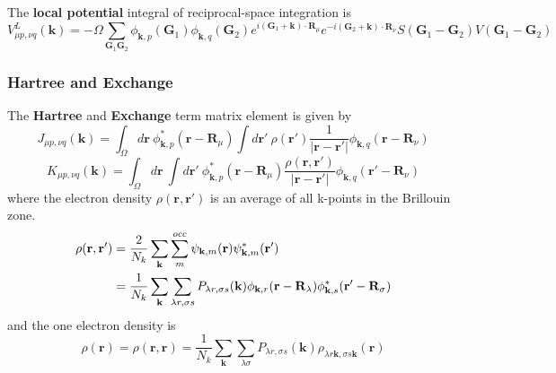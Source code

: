 \documentclass{article}
\begin{document}
            The \textbf{local potential} integral of reciprocal-space integration is
            \begin{equation}
                V_{\mu p,\nu q}^L(\textbf{k}) = -\Omega\sum_{\textbf{G}_1\textbf{G}_2}\phi_{\textbf{k},p}(\textbf{G}_1)\phi_{\textbf{k},q}(\textbf{G}_2)e^{i(\textbf{G}_1+\textbf{k})\cdot\textbf{R}_{\mu}}e^{-i(\textbf{G}_2+\textbf{k})\cdot\textbf{R}_{\nu}}S(\textbf{G}_1-\textbf{G}_2)V(\textbf{G}_1-\textbf{G}_2)
            \end{equation}         
            
        \subsubsection{Hartree and Exchange}
            The \textbf{Hartree} and \textbf{Exchange} term matrix element is given by
            \begin{equation}
                J_{\mu p,\nu q}(\textbf{k}) = \int_{\Omega}d\textbf{r}\ \phi_{\textbf{k},p}^*(\textbf{r}-\textbf{R}_{\mu})\int d\textbf{r}'\ \rho(\textbf{r}')\frac{1}{\left|\textbf{r}-\textbf{r}'\right|}\phi_{\textbf{k},q}(\textbf{r}-\textbf{R}_{\nu})\label{hartree}
            \end{equation}
            \begin{equation}
                K_{\mu p,\nu q}(\textbf{k}) = \int_{\Omega}d\textbf{r}\ \int d\textbf{r}'\ \phi_{\textbf{k},p}^*(\textbf{r}-\textbf{R}_{\mu})\frac{\rho(\textbf{r},\textbf{r}')}{\left|\textbf{r}-\textbf{r}'\right|}\phi_{\textbf{k},q}(\textbf{r}'-\textbf{R}_{\nu})\label{exchange}
            \end{equation}
            where the electron density $\rho(\textbf{r},\textbf{r}')$ is an average of all k-points in the Brillouin zone.
            \begin{align}
                \rho(\textbf{r},\textbf{r}') &= \frac{2}{N_k}\sum_{\textbf{k}}\sum_m^{occ}\psi_{\textbf{k},m}(\textbf{r})\psi_{\textbf{k},m}^*(\textbf{r}')\notag\\
                &= \frac{1}{N_k}\sum_{\textbf{k}}\sum_{\lambda r,\sigma s}P_{\lambda r,\sigma s}(\textbf{k})\phi_{\textbf{k},r}(\textbf{r}-\textbf{R}_{\lambda})\phi_{\textbf{k},s}^*(\textbf{r}'-\textbf{R}_{\sigma})
            \end{align}
            and the one electron density is
            \begin{equation}
                \rho(\textbf{r}) = \rho(\textbf{r},\textbf{r}) = \frac{1}{N_k}\sum_{\textbf{k}}\sum_{\lambda\sigma}P_{\lambda r,\sigma s}(\textbf{k})\rho_{\lambda r\textbf{k},\sigma s\textbf{k}}(\textbf{r})
            \end{equation}
\end{document}
